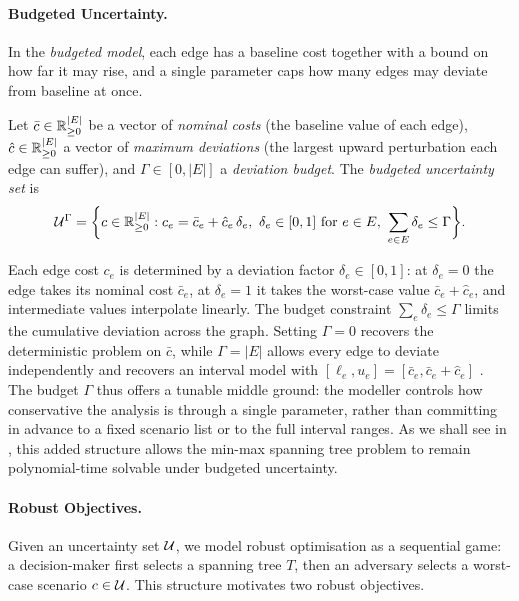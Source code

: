 \paragraph{Budgeted Uncertainty.}

In the \emph{\textcolor{RWTHBlue}{budgeted model}}, each edge has a baseline cost together with a bound on how far it may rise, and a single parameter caps how many edges may deviate from baseline at once.

\begin{definition}\label{def:budgeted-uncertainty}
Let $\bar{c} \in \mathbb{R}^{|E|}_{\geq 0}$ be a vector of \emph{\textcolor{RWTHBlue}{nominal costs}} (the baseline value of each edge), $\hat{c} \in \mathbb{R}^{|E|}_{\geq 0}$ a vector of \emph{\textcolor{RWTHBlue}{maximum deviations}} (the largest upward perturbation each edge can suffer), and $\Gamma \in [0, |E|]$ a \emph{\textcolor{RWTHBlue}{deviation budget}}.
The \emph{\textcolor{RWTHBlue}{budgeted uncertainty set}} is
\[
\mathcal{U}^{\Gamma} = \biggl\{ c \in \mathbb{R}^{|E|}_{\geq 0} : c_e = \bar{c}_e + \hat{c}_e\, \delta_e,\ \delta_e \in [0,1] \text{ for } e \in E,\ \sum_{e \in E} \delta_e \leq \Gamma \biggr\}.
\]
\end{definition}

Each edge cost $c_e$ is determined by a deviation factor $\delta_e \in [0,1]$: at $\delta_e = 0$ the edge takes its nominal cost $\bar{c}_e$, at $\delta_e = 1$ it takes the worst-case value $\bar{c}_e + \hat{c}_e$, and intermediate values interpolate linearly.
The budget constraint $\sum_e \delta_e \leq \Gamma$ limits the cumulative deviation across the graph.
Setting $\Gamma = 0$ recovers the deterministic problem on $\bar{c}$, while $\Gamma = |E|$ allows every edge to deviate independently and recovers an interval model with $[\ell_e, u_e] = [\bar{c}_e, \bar{c}_e + \hat{c}_e]$ \cite{Goerigk2021RCO}.
The budget $\Gamma$ thus offers a tunable middle ground: the modeller controls how conservative the analysis is through a single parameter, rather than committing in advance to a fixed scenario list or to the full interval ranges.
As we shall see in , this added structure allows the min-max spanning tree problem to remain polynomial-time solvable under budgeted uncertainty.

\paragraph{Robust Objectives.}

Given an uncertainty set $\mathcal{U}$, we model robust optimisation as a sequential game: a decision-maker first selects a spanning tree $T$, then an adversary selects a worst-case scenario $c \in \mathcal{U}$.
This structure motivates two robust objectives.

